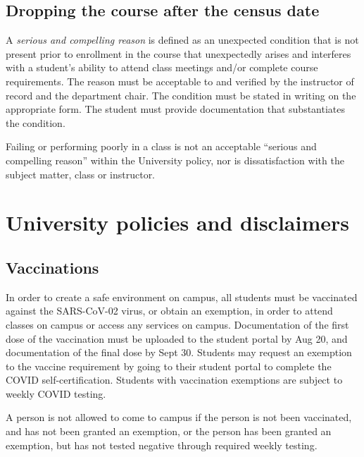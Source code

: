 \hypertarget{sec:dropping-the-course-after-the-census-date}{%
\subsection{Dropping the course after the census
date}\label{sec:dropping-the-course-after-the-census-date}}

A \emph{serious and compelling reason} is defined as an unexpected
condition that is not present prior to enrollment in the course that
unexpectedly arises and interferes with a student's ability to attend
class meetings and/or complete course requirements. The reason must be
acceptable to and verified by the instructor of record and the
department chair. The condition must be stated in writing on the
appropriate form. The student must provide documentation that
substantiates the condition.

Failing or performing poorly in a class is not an acceptable ``serious
and compelling reason'' within the University policy, nor is
dissatisfaction with the subject matter, class or instructor.

\hypertarget{sec:university-policies-and-disclaimers}{%
\section{University policies and
disclaimers}\label{sec:university-policies-and-disclaimers}}

\hypertarget{sec:vaccinations}{%
\subsection{Vaccinations}\label{sec:vaccinations}}

In order to create a safe environment on campus, all students must be
vaccinated against the SARS-CoV-02 virus, or obtain an exemption, in
order to attend classes on campus or access any services on campus.
Documentation of the first dose of the vaccination must be uploaded to
the student portal by Aug 20, and documentation of the final dose by
Sept 30. Students may request an exemption to the vaccine requirement by
going to their student portal to complete the COVID self-certification.
Students with vaccination exemptions are subject to weekly COVID
testing.

A person is not allowed to come to campus if the person is not been
vaccinated, and has not been granted an exemption, or the person has
been granted an exemption, but has not tested negative through required
weekly testing.

